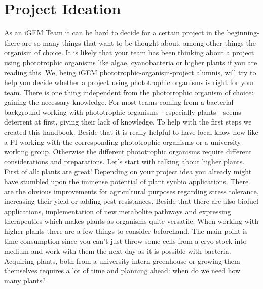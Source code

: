 \section{Project Ideation}
As an iGEM Team it can be hard to decide for a certain project in the beginning- there are so many things that want to be thought about, among other things the organism of choice. It is likely that your team has been thinking about a project using phototrophic organisms like algae, cyanobacteria or higher plants if you are reading this. We, being iGEM phototrophic-organism-project alumnis, will try to help you decide whether a project using phototrophic organisms is right for your team.
\newline\newline
There is one thing independent from the phototrophic organism of choice: gaining the necessary knowledge. For most teams coming from a bacterial background working with phototrophic organisms - especially plants - seems deterrent at first, giving their lack of knowledge. To help with the first steps we created this handbook. Beside that it is really helpful to have local know-how like a PI working with the corresponding phototrophic organisms or a university working group.
\newline\newline
Otherwise the different phototrophic organisms require different considerations and preparations.
\newline\newline
Let's start with talking about higher plants. First of all: plants are great! Depending on your project idea you already might have stumbled upon the immense potential of plant synbio applications. 
There are the obvious improvements for agricultural purposes regarding stress tolerance, increasing their yield or adding pest resistances. 
Beside that there are also biofuel applications, implementation of new metabolite pathways and expressing therapeutics which makes plants as organisms quite versatile.
\newline\newline
When working with higher plants there are a few things to consider beforehand. The main point is time consumption since you can't just throw some cells from a cryo-stock into medium and work with them the next day as it is possible with bacteria. Acquiring plants, both from a university-intern greenhouse or growing them themselves requires a lot of time and planning ahead: when do we need how many plants? 
\newline\newline
